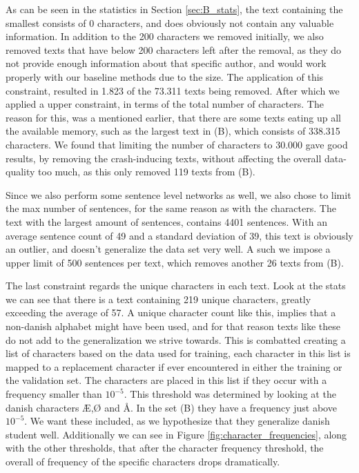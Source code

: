 As can be seen in the statistics in Section \ref{sec:B_stats}, the text
containing the smallest consists of 0 characters, and does obviously not
contain any valuable information. In addition to the 200 characters we removed
initially, we also removed texts that have below 200 characters left after the
removal, as they do not provide enough information about that specific author,
and would work properly with our baseline methods due to the size.
The application of this constraint, resulted in 1.823 of the 73.311 texts
being removed. After which we applied a upper constraint, in terms of the total
number of characters. The reason for this, was a mentioned earlier, that there
are some texts eating up all the available memory, such as the largest text in
(B), which consists of 338.315 characters. We found that limiting the number of
characters to 30.000 gave good results, by removing the crash-inducing texts,
without affecting the overall data-quality too much, as this only removed 119
texts from (B).

Since we also perform some sentence level networks as well, we also chose to
limit the max number of sentences, for the same reason as with the characters.
The text with the largest amount of sentences, contains 4401 sentences. With
an average sentence count of 49 and a standard deviation of 39, this text is
obviously an outlier, and doesn't generalize the data set very well. A such we
impose a upper limit of 500 sentences per text, which removes another 26 texts
from (B).

The last constraint regards the unique characters in each text. Look at the
stats we can see that there is a text containing 219 unique characters, greatly
exceeding the average of 57. A unique character count like this, implies that a
non-danish alphabet might have been used, and for that reason texts like these
do not add to the generalization we strive towards. This is combatted creating a
list of characters based on the data used for training, each character in this
list is mapped to a replacement character if ever encountered in either the
training or the validation set. The characters are placed in this list if they
occur with a frequency smaller than $10^{-5}$. This threshold was determined
by looking at the danish characters Æ,Ø and Å. In the set (B) they have
a frequency just above $10^{-5}$. We want these included, as we hypothesize
that they generalize danish student well. Additionally we can see in Figure
\ref{fig:character_frequencies}, along with the other thresholds, that after
the character frequency threshold, the overall of frequency of the specific
characters drops dramatically.

